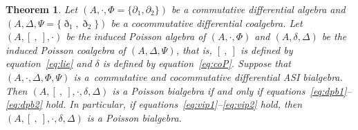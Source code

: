 \documentclass[pdftex]{sigma}
\numberwithin{equation}{section}
\newtheorem{Theorem}{Theorem}[section]
\begin{document}
\begin{Theorem}\label{thm:asspoibi}
 Let $(A,\cdot, \Phi = \{\partial_1, \partial_2\})$ be a commutative differential algebra and $(A, \Delta, \Psi = \{\eth_1, \eth_2\})$ be a cocommutative differential coalgebra.
 Let $(A, [\ ,\ ], \cdot)$ be the induced Poisson algebra of $(A,\cdot, \Phi)$ and $(A, \delta, \Delta)$ be the induced Poisson coalgebra of $(A, \Delta, \Psi)$,
 that is, $[\ ,\ ]$ is defined by equation~\eqref{eq:lie} and $\delta$ is defined by equation~\eqref{eq:coP}.
 Suppose that $(A, \cdot, \Delta, \Phi, \Psi)$ is a~commutative and cocommutative differential ASI bialgebra.
 Then $(A, [\ ,\ ], \cdot, \delta, \Delta)$ is a Poisson bialgebra if and only if equations~\eqref{eq:dpb1}--\eqref{eq:dpb2} hold.
 In particular, if equations~\eqref{eq:vip1}--\eqref{eq:vip2} hold, then $(A, [\ ,\ ], \cdot, \delta, \Delta)$ is a Poisson bialgebra.
\end{Theorem}
\end{document}
